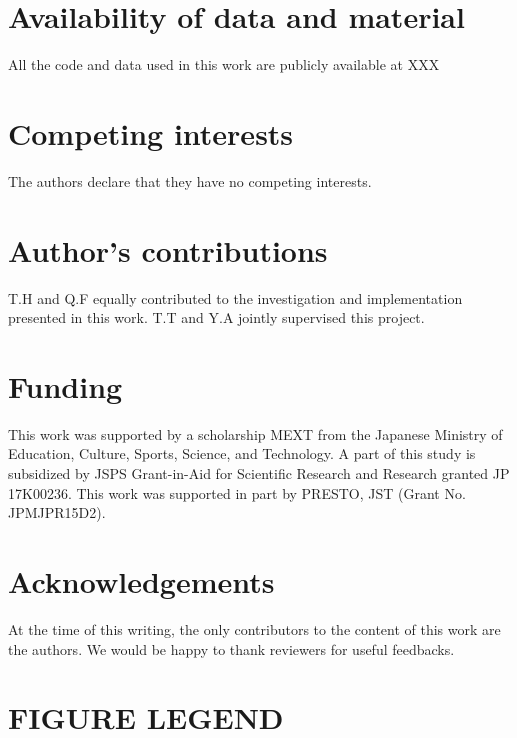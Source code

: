 \documentclass[twocolumn]{bmcart}
\def\texttt{[image: ]}
\begin{document}
\begin{backmatter}
\section*{Availability of data and material}
All the code and data used in this work are publicly available at XXX

\section*{Competing interests}
The authors declare that they have no competing interests.

\section*{Author's contributions}
T.H and Q.F equally contributed to the investigation and implementation presented in this work. T.T and Y.A jointly supervised this project.

\section*{Funding}
This work was supported by a scholarship MEXT from the Japanese Ministry of Education, Culture, Sports, Science, and Technology. 
A part of this study is subsidized by JSPS Grant-in-Aid for Scientific Research and Research granted JP 17K00236. 
This work was supported in part by PRESTO, JST (Grant No. JPMJPR15D2).

\section*{Acknowledgements}
At the time of this writing, the only contributors to the content of this work are the authors. We would be happy to thank reviewers for useful feedbacks.




\section*{FIGURE LEGEND}


\end{backmatter}
\end{document}
